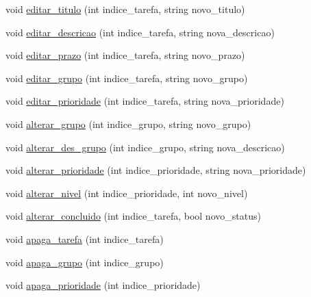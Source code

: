\begin{DoxyCompactItemize}
void \hyperlink{classStorage_a6164e94fc3a86249dcce0aa66320ad2b}{editar\+\_\+titulo} (int indice\+\_\+tarefa, string novo\+\_\+titulo)
\item 
void \hyperlink{classStorage_aca052dc1a570f55746a66f1dd7795354}{editar\+\_\+descricao} (int indice\+\_\+tarefa, string nova\+\_\+descricao)
\item 
void \hyperlink{classStorage_a593548cb2b9ee3e570dae32b55140a0c}{editar\+\_\+prazo} (int indice\+\_\+tarefa, string novo\+\_\+prazo)
\item 
void \hyperlink{classStorage_a34a852bccbf913731f17a654e6e97c5a}{editar\+\_\+grupo} (int indice\+\_\+tarefa, string novo\+\_\+grupo)
\item 
void \hyperlink{classStorage_a15c3a41053de23043a4b16c751515804}{editar\+\_\+prioridade} (int indice\+\_\+tarefa, string nova\+\_\+prioridade)
\item 
void \hyperlink{classStorage_a9ffb7a7dad34dc12d3dc4e6808e5f431}{alterar\+\_\+grupo} (int indice\+\_\+grupo, string novo\+\_\+grupo)
\item 
void \hyperlink{classStorage_af487be83a5acaf49850f9fff02e0e30f}{alterar\+\_\+des\+\_\+grupo} (int indice\+\_\+grupo, string nova\+\_\+descricao)
\item 
void \hyperlink{classStorage_aad0905f797b2112aa95846bbb1714873}{alterar\+\_\+prioridade} (int indice\+\_\+prioridade, string nova\+\_\+prioridade)
\item 
void \hyperlink{classStorage_a3e7f675101378565f4f63d799e8408ae}{alterar\+\_\+nivel} (int indice\+\_\+prioridade, int novo\+\_\+nivel)
\item 
void \hyperlink{classStorage_acd2ad4c9120d2968cb811be2d96ce7ea}{alterar\+\_\+concluido} (int indice\+\_\+tarefa, bool novo\+\_\+status)
\item 
void \hyperlink{classStorage_a2b6c4db3728ad5f6f9787b7af199b4a0}{apaga\+\_\+tarefa} (int indice\+\_\+tarefa)
\item 
void \hyperlink{classStorage_abf9179dcd9d27a8e1b5faf74d254f1bb}{apaga\+\_\+grupo} (int indice\+\_\+grupo)
\item 
void \hyperlink{classStorage_ac05b88b868646f514f2c8c114c28ce60}{apaga\+\_\+prioridade} (int indice\+\_\+prioridade)
\end{DoxyCompactItemize}

